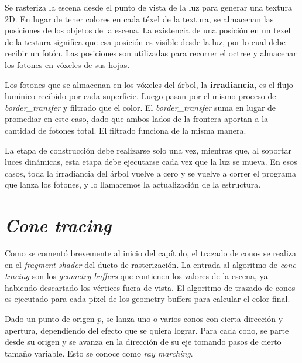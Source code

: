 Se rasteriza la escena desde el punto de vista de la luz para generar una textura 2D.
En lugar de tener colores en cada téxel de la textura, se almacenan las posiciones de los objetos de la escena.
La existencia de una posición en un texel de la textura significa que esa posición es visible desde la luz, por lo cual debe recibir un fotón.
Las posiciones son utilizadas para recorrer el octree y almacenar los fotones en vóxeles de sus hojas.

Los fotones que se almacenan en los vóxeles del árbol, la \textbf{irradiancia}, es el flujo lumínico recibido por cada superficie.
Luego pasan por el mismo proceso de \textit{border\_transfer} y filtrado que el color.
El \textit{border\_transfer} suma en lugar de promediar en este caso, dado que ambos lados de la frontera aportan a la cantidad de fotones total.
El filtrado funciona de la misma manera.

La etapa de construcción debe realizarse solo una vez, mientras que, al soportar luces dinámicas, esta etapa debe ejecutarse cada vez que la luz se mueva.
En esos casos, toda la irradiancia del árbol vuelve a cero y se vuelve a correr el programa que lanza los fotones, y lo llamaremos la actualización de la estructura.


\section{\textit{Cone tracing}}\label{sec:cone_tracing}

Como se comentó brevemente al inicio del capítulo, el trazado de conos se realiza en el \textit{fragment shader} del ducto de rasterización.
La entrada al algoritmo de \textit{cone tracing} son los \textit{geometry buffers} que contienen los valores de la escena, ya habiendo descartado los vértices fuera de vista.
El algoritmo de trazado de conos es ejecutado para cada píxel de los geometry buffers para calcular el color final.

Dado un punto de origen $p$, se lanza uno o varios conos con cierta dirección y apertura, dependiendo del efecto que se quiera lograr.
Para cada cono, se parte desde su origen y se avanza en la dirección de su eje tomando pasos de cierto tamaño variable.
Esto se conoce como \textit{ray marching}. %

